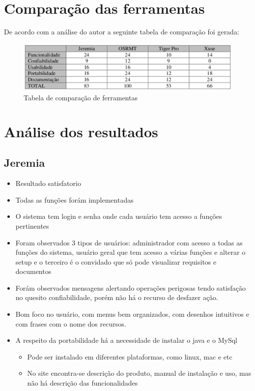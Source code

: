 \section{Comparação das ferramentas}

  De acordo com a análise do autor a seguinte tabela de comparação foi gerada:

  \begin{figure}[!h]
    \centering
    \includegraphics[width=15cm, keepaspectratio=true]{figuras/ferramentas/comp.eps}
    \caption{Tabela de comparação de ferramentas}
  \end{figure}

\section{Análise dos resultados}

\subsection{Jeremia}

  \begin{itemize}
    \item Resultado satisfatorio
    \item Todas as funções forám implementadas
    \item O sistema tem login e senha onde cada usuário tem acesso a funções pertinentes
    \item Foram observados 3 tipos de usuários: administrador com acesso a todas as funções do sistema, usuário geral
      que tem acesso a várias funções e alterar o setup e o terceiro é o convidado que só pode visualizar requisitos e
      documentos
    \item Forám observados mensagens alertando operações perigosas tendo satisfação no quesito confiabilidade, porém não
      há o recurso de desfazer ação.
    \item Bom foco no usuário, com menus bem organizados, com desenhos intuitivos e com frases com o nome dos recursos.
    \item A respeito da portabilidade há a necessidade de instalar o java e o MySql
      \begin{itemize}
        \item Pode ser instalado em diferentes plataformas, como linux, mac e etc
        \item No site encontra-se descrição do produto, manual de instalação e uso, mas não há descrição das funcionalidades
      \end{itemize}
  \end{itemize}

